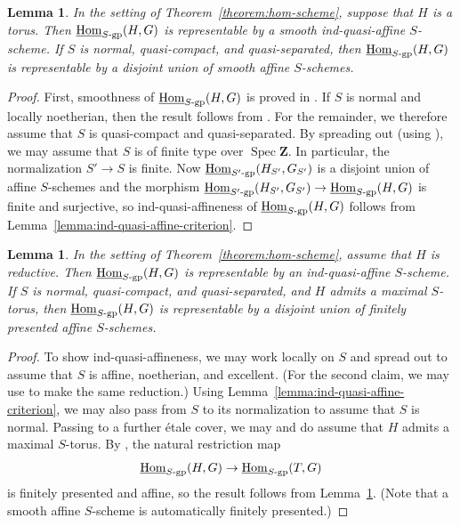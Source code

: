 \documentclass[11pt, letterpaper,english]{amsart}
\theoremstyle{plain}
\newtheorem{lemma}[lem]{Lemma}
\theoremstyle{definition}
\numberwithin{equation}{section}
\numberwithin{lem}{section}
\newcommand{\mathfont}{\mathbf}
\newcommand{\bZ}{\mathfont{Z}}
\DeclareMathOperator{\Hom}{Hom}
\DeclareMathOperator{\Spec}{Spec}
\begin{document}
\begin{lemma}\label{lemma:torus-source}
In the setting of Theorem~\ref{theorem:hom-scheme}, suppose that $H$ is a torus. Then $\underline{\Hom}_{S\textrm{-}\rm{gp}}(H, G)$ is representable by a smooth ind-quasi-affine $S$-scheme. If $S$ is normal, quasi-compact, and quasi-separated, then $\underline{\Hom}_{S\textrm{-}\rm{gp}}(H, G)$ is representable by a disjoint union of smooth affine $S$-schemes.
\end{lemma}

\begin{proof}
First, smoothness of $\underline{\Hom}_{S\textrm{-}\rm{gp}}(H, G)$ is proved in \cite[Exp.\ XI, Corollaire 4.2]{sga3}. If $S$ is normal and locally noetherian, then the result follows from \cite[Th\'eor\`eme IX 2.6]{Faisceaux-amples}. For the remainder, we therefore assume that $S$ is quasi-compact and quasi-separated. By spreading out (using \cite[Theorem C.9]{Thomason-Trobaugh}), we may assume that $S$ is of finite type over $\Spec \bZ$. In particular, the normalization $S' \to S$ is finite. Now $\underline{\Hom}_{S'\textrm{-}\rm{gp}}(H_{S'}, G_{S'})$ is a disjoint union of affine $S$-schemes and the morphism $\underline{\Hom}_{S'\textrm{-}\rm{gp}}(H_{S'}, G_{S'}) \to \underline{\Hom}_{S\textrm{-}\rm{gp}}(H, G)$ is finite and surjective, so ind-quasi-affineness of $\underline{\Hom}_{S\textrm{-}\rm{gp}}(H, G)$ follows from Lemma~\ref{lemma:ind-quasi-affine-criterion}.
\end{proof}

\begin{lemma}\label{lemma:hom-scheme-reductive}
In the setting of Theorem~\ref{theorem:hom-scheme}, assume that $H$ is reductive. Then $\underline{\Hom}_{S\textrm{-}\rm{gp}}(H, G)$ is representable by an ind-quasi-affine $S$-scheme. If $S$ is normal, quasi-compact, and quasi-separated, and $H$ admits a maximal $S$-torus, then $\underline{\Hom}_{S\textrm{-}\rm{gp}}(H, G)$ is representable by a disjoint union of finitely presented affine $S$-schemes.
\end{lemma}

\begin{proof}
To show ind-quasi-affineness, we may work locally on $S$ and spread out to assume that $S$ is affine, noetherian, and excellent. (For the second claim, we may use \cite[Theorem C.9]{Thomason-Trobaugh} to make the same reduction.) Using Lemma~\ref{lemma:ind-quasi-affine-criterion}, we may also pass from $S$ to its normalization to assume that $S$ is normal. Passing to a further \'{e}tale cover, we may and do assume that $H$ admits a maximal $S$-torus. By \cite[Exp.\ XXIV, Corollaire 7.1.9]{sga3}, the natural restriction map
\[
\underline{\Hom}_{S\textrm{-}\rm{gp}}(H, G) \to \underline{\Hom}_{S\textrm{-}\rm{gp}}(T, G)
\]
is finitely presented and affine, so the result follows from Lemma~\ref{lemma:torus-source}. (Note that a smooth affine $S$-scheme is automatically finitely presented.)
\end{proof}
\end{document}

